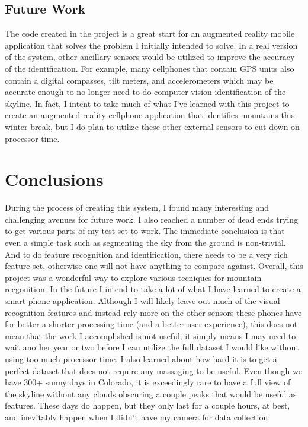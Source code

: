 \documentclass{acm_proc_article-sp}
\begin{document}
\subsection{Future Work}
    The code created in the project is a great start for an augmented reality mobile application that solves the problem I initially intended to solve.  In a real version of the system, other ancillary sensors would be utilized to improve the accuracy of the identification.  For example, many cellphones that contain GPS units also contain a digital compasses, tilt meters, and accelerometers which may be accurate enough to no longer need to do computer vision identification of the skyline.  In fact, I intent to take much of what I’ve learned with this project to create an augmented reality cellphone application that identifies mountains this winter break, but I do plan to utilize these other external sensors to cut down on processor time.


\section{Conclusions}
During the process of creating this system, I found many interesting and challenging avenues for future work.  I also reached a number of dead ends trying to get various parts of my test set to work.  The immediate conclusion is that even a simple task such as segmenting the sky from the ground is non-trivial.  And to do feature recognition and identification, there needs to be a very rich feature set, otherwise one will not have anything to compare against.  Overall, this project was a wonderful way to explore various tecniques for mountain recgonition.  In the future I intend to take a lot of what I have learned to create a smart phone application.  Although I will likely leave out much of the visual recognition features and instead rely more on the other sensors these phones have for better a shorter processing time (and a better user experience), this does not mean that the work I accomplished is not useful; it simply means I may need to wait another year or two before I can utilize the full dataset I would like without using too much processor time.
I also learned about how hard it is to get a perfect dataset that does not require any massaging to be useful.  Even though we have 300+ sunny days in Colorado, it is exceedingly rare to have a full view of the skyline without any clouds obscuring a couple peaks that would be useful as features.  These days do happen, but they only last for a couple hours, at best, and inevitably happen when I didn't have my camera for data collection.



\end{document}
